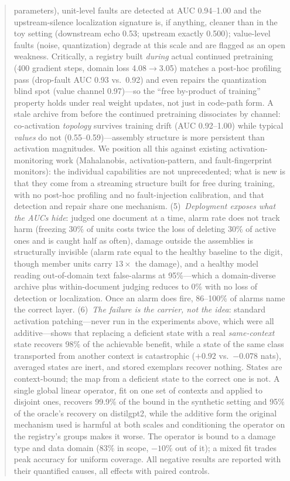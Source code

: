 \documentclass[11pt]{article}
\begin{document}
\begin{abstract}
parameters), unit-level faults are detected at AUC 0.94--1.00 and the
upstream-silence localization signature is, if anything, cleaner than in the
toy setting (downstream echo 0.53; upstream exactly 0.500); value-level faults
(noise, quantization) degrade at this scale and are flagged as an open
weakness. Critically, a registry built \emph{during} actual continued
pretraining (400 gradient steps, domain loss 4.08$\rightarrow$3.05) matches a
post-hoc profiling pass (drop-fault AUC 0.93 vs.\ 0.92) and even repairs the
quantization blind spot (value channel 0.97)---so the ``free by-product of
training'' property holds under real weight updates, not just in code-path
form. A stale archive from before the continued pretraining dissociates by
channel: co-activation \emph{topology} survives training drift (AUC
0.92--1.00) while typical \emph{values} do not (0.55--0.59)---assembly
structure is more persistent than activation magnitudes. We position all this
against existing activation-monitoring work (Mahalanobis, activation-pattern,
and fault-fingerprint monitors): the individual capabilities are not
unprecedented; what is new is that they come from a streaming structure built
for free during training, with no post-hoc profiling and no fault-injection
calibration, and that detection and repair share one mechanism.
(5)~\emph{Deployment exposes what the AUCs hide}: judged one document at a
time, alarm rate does not track harm (freezing 30\% of units costs twice the
loss of deleting 30\% of active ones and is caught half as often), damage
outside the assemblies is structurally invisible (alarm rate equal to the
healthy baseline to the digit, though member units carry $13\times$ the
damage), and a healthy model reading out-of-domain text false-alarms at
95\%---which a domain-diverse archive plus within-document judging reduces to
0\% with no loss of detection or localization. Once an alarm does fire,
86--100\% of alarms name the correct layer.
(6)~\emph{The failure is the carrier, not the idea}: standard activation
patching---never run in the experiments above, which were all additive---shows
that replacing a deficient state with a real \emph{same-context} state recovers
98\% of the achievable benefit, while a state of the same class transported from
another context is catastrophic ($+0.92$ vs.\ $-0.078$ nats), averaged states
are inert, and stored exemplars recover nothing. States are context-bound; the
map from a deficient state to the correct one is not. A single global linear
operator, fit on one set of contexts and applied to disjoint ones, recovers
99.9\% of the bound in the synthetic setting and 95\% of the oracle's recovery
on distilgpt2, while the additive form the original mechanism used is harmful at
both scales and conditioning the operator on the registry's groups makes it
worse. The operator is bound to a damage type and data domain (83\% in scope,
$-10\%$ out of it); a mixed fit trades peak accuracy for uniform coverage.
All negative results are reported with their quantified causes, all effects with
paired controls.
\end{abstract}
\end{document}

